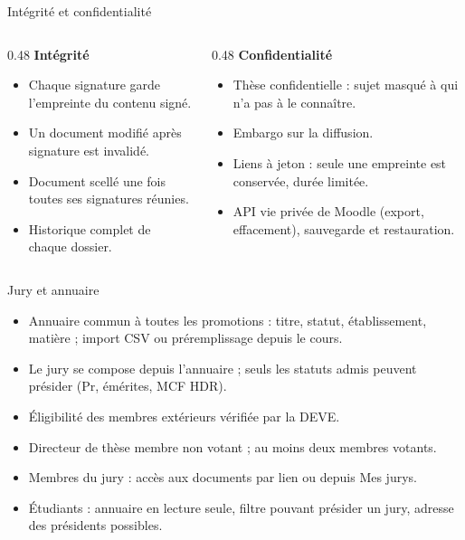 \documentclass[aspectratio=169,11pt]{beamer}
\begin{document}
\begin{frame}{Intégrité et confidentialité}
  \begin{columns}[T]
    \begin{column}{0.48\textwidth}
      \textbf{Intégrité}
      \begin{itemize}
        \item Chaque signature garde l'\alert{empreinte} du contenu signé.
        \item Un document modifié après signature est invalidé.
        \item Document \alert{scellé} une fois toutes ses signatures réunies.
        \item Historique complet de chaque dossier.
      \end{itemize}
    \end{column}
    \begin{column}{0.48\textwidth}
      \textbf{Confidentialité}
      \begin{itemize}
        \item Thèse confidentielle : sujet masqué à qui n'a pas à le connaître.
        \item Embargo sur la diffusion.
        \item Liens à jeton : seule une empreinte est conservée, durée limitée.
        \item API vie privée de Moodle (export, effacement), sauvegarde et restauration.
      \end{itemize}
    \end{column}
  \end{columns}
\end{frame}

\begin{frame}{Jury et annuaire}
  \begin{itemize}
    \item \alert{Annuaire commun} à toutes les promotions : titre, statut, établissement, matière ; import CSV ou préremplissage depuis le cours.
    \item Le jury se compose depuis l'annuaire ; seuls les statuts admis peuvent présider (Pr, émérites, MCF HDR).
    \item Éligibilité des membres extérieurs vérifiée par la DEVE.
    \item Directeur de thèse membre \alert{non votant} ; au moins deux membres votants.
    \item Membres du jury : accès aux documents par lien ou depuis \og Mes jurys\fg{}.
    \item Étudiants : annuaire en lecture seule, filtre \og pouvant présider un jury\fg{}, adresse des présidents possibles.
  \end{itemize}
\end{frame}
\end{document}
